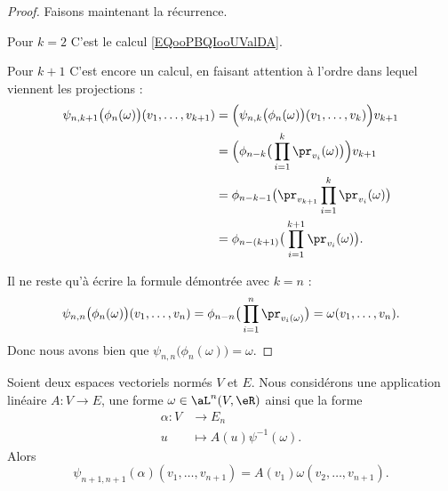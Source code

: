 \begin{proof}
    Faisons maintenant la récurrence.
    \begin{subproof}
        \item[Pour \( k=2\)]
            C'est le calcul \eqref{EQooPBQIooUValDA}.
        \item[Pour \( k+1\)]
            C'est encore un calcul, en faisant attention à l'ordre dans lequel viennent les projections :
            \begin{subequations}
                \begin{align}
                    \psi_{n,k+1}\big( \phi_n(\omega) \big)(v_1,\ldots, v_{k+1})&=\Big( \psi_{n,k}\big( \phi_n(\omega) \big)(v_1,\ldots, v_k) \Big)v_{k+1}\\
                    &=\Big( \phi_{n-k}\big( \prod_{i=1}^k\pr_{v_i}(\omega) \big) \Big)v_{k+1}\\
                    &=\phi_{n-k-1}\big( \pr_{v_{k+1}}\prod_{i=1}^k\pr_{v_i}(\omega) \big)\\
                    &=\phi_{n-(k+1)}\big( \prod_{i=1}^{k+1}\pr_{v_i}(\omega) \big).
                \end{align}
            \end{subequations}
    \end{subproof}
    Il ne reste qu'à écrire la formule démontrée avec \( k=n\) :
    \begin{equation}
        \psi_{n,n}\big( \phi_n(\omega) \big)(v_1,\ldots, v_n)=\phi_{n-n}\big( \prod_{i=1}^n\pr_{v_i(\omega)} \big)=\omega(v_1,\ldots, v_n).
    \end{equation}
    Donc nous avons bien que \( \psi_{n,n}\big( \phi_n(\omega) \big)=\omega\).
\end{proof}

\begin{lemma}
    Soient deux espaces vectoriels normés \( V\) et \( E\). Nous considérons une application linéaire \( A\colon V\to E\), une forme \( \omega\in\aL^n(V,\eR)\) ainsi que la forme
    \begin{equation}
        \begin{aligned}
            \alpha\colon V&\to E_n \\
            u&\mapsto A(u)\psi^{-1}(\omega).
        \end{aligned}
    \end{equation}
    Alors
    \begin{equation}
        \psi_{n+1,n+1}(\alpha)(v_1,\ldots, v_{n+1})=A(v_1)\omega(v_2,\ldots, v_{n+1}).
    \end{equation}
\end{lemma}

